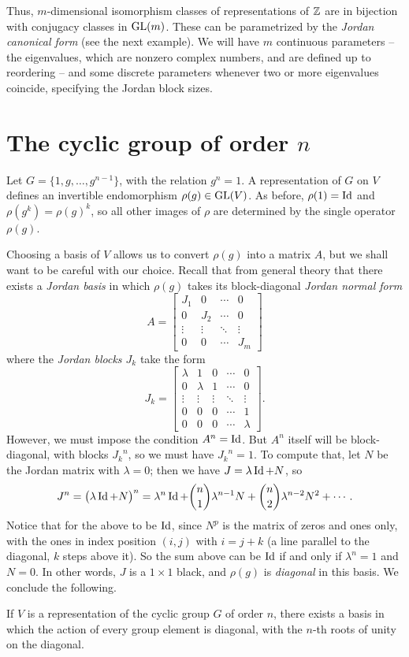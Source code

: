 Thus, \(m\)-dimensional isomorphism classes of representations of \(\mathbb{Z}\)
are in bijection with conjugacy classes in \(\operatorname{GL}(m)\). These can be
parametrized by the \emph{Jordan canonical form} (see the next
example). We will have \(m\) continuous parameters -- the eigenvalues,
which are nonzero complex numbers, and are defined up to reordering -- and
some discrete parameters whenever two or more eigenvalues coincide,
specifying the Jordan block sizes.

\section{The cyclic group of order \(n\)}
Let \(G=\{1,g,\dotsc,g^{n-1}\}\), with the relation \(g^n=1\). A
representation of \(G\) on \(V\) defines an invertible endomorphism
\(\rho(g)\in \operatorname{GL}(V)\). As before, \(\rho(1)=\operatorname{Id}\) and
\(\rho(g^k)=\rho(g)^k\), so all other images of \(\rho\) are determined by
the single operator \(\rho(g)\).

Choosing a basis of \(V\) allows us to convert \(\rho(g)\) into a matrix
\(A\), but we shall want to be careful with our choice. Recall that from
general theory that there exists a \emph{Jordan basis} in which \(\rho(g)\)
takes its block-diagonal \emph{Jordan normal form}
\[
  A=
  \begin{bmatrix}
    J_1&0&\cdots&0\\
    0&J_2&\cdots&0\\
    \vdots&\vdots&\ddots&\vdots\\
    0&0&\cdots&J_m
  \end{bmatrix}
\]
where the \emph{Jordan blocks \(J_k\)} take the form
\[
J_k=
\begin{bmatrix}
  \lambda&1&0&\cdots&0\\
  0&\lambda&1&\cdots&0\\
  \vdots&\vdots&\vdots&\ddots&\vdots\\
  0&0&0&\cdots&1\\
  0&0&0&\cdots&\lambda
\end{bmatrix}.
\]
However, we must impose the condition \(A^n=\operatorname{Id}\). But \(A^n\) itself will
be block-diagonal, with blocks \({J_k}^n\), so we must have
\({J_k}^n=1\). To compute that, let \(N\) be the Jordan matrix with
\(\lambda=0\); then we have \(J=\lambda\operatorname{Id}+N\), so
\[
J^n=\bigl(\lambda\operatorname{Id}+N\bigr)^n=\lambda^n\operatorname{Id}+\binom{n}{1}\lambda^{n-1}N+\binom{n}{2}\lambda^{n-2}N^2+\dotsb.
\]
Notice that for the above to be \(\operatorname{Id}\), since \(N^p\) is the matrix of
zeros and ones only, with the ones in index position \((i,j)\) with
\(i=j+k\) (a line parallel to the diagonal, \(k\) steps above it). So the
sum above can be \(\operatorname{Id}\) if and only if \(\lambda^n=1\) and \(N=0\). In
other words, \(J\) is a \(1\times 1\) black, and \(\rho(g)\) is
\emph{diagonal} in this basis. We conclude the following.

\begin{proposition}
  If \(V\) is a representation of the cyclic group \(G\) of order \(n\),
  there exists a basis in which the action of every group element is
  diagonal, with the \(n\)-th roots of unity on the diagonal.
\end{proposition}


